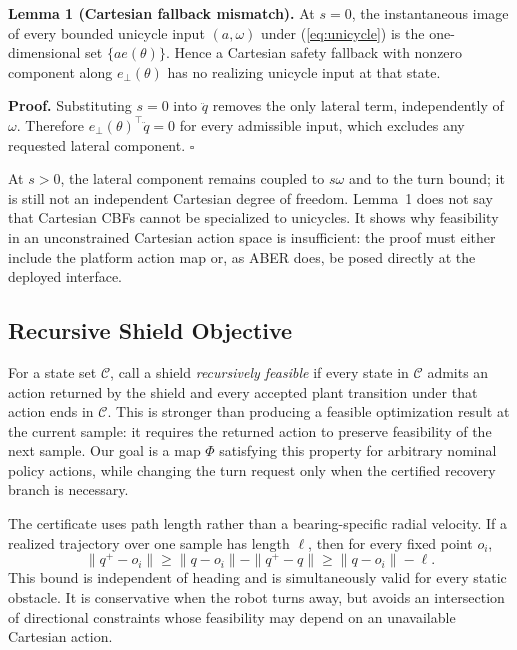 \documentclass[letterpaper]{article}
\begin{document}
\textbf{Lemma 1 (Cartesian fallback mismatch).}
At $s=0$, the instantaneous image of every bounded unicycle input
$(a,\omega)$ under (\ref{eq:unicycle}) is the one-dimensional set
$\{a e(\theta)\}$.  Hence a Cartesian safety fallback with nonzero component
along $e_\perp(\theta)$ has no realizing unicycle input at that state.

\textbf{Proof.}
Substituting $s=0$ into $\ddot q$ removes the only lateral term, independently
of $\omega$.  Therefore $e_\perp(\theta)^\top\ddot q=0$ for every admissible
input, which excludes any requested lateral component. $\square$

At $s>0$, the lateral component remains coupled to $s\omega$ and to the turn
bound; it is still not an independent Cartesian degree of freedom.  Lemma~1
does not say that Cartesian CBFs cannot be specialized to unicycles.  It shows
why feasibility in an unconstrained Cartesian action space is insufficient:
the proof must either include the platform action map or, as ABER does, be
posed directly at the deployed interface.

\subsection{Recursive Shield Objective}

For a state set $\mathcal C$, call a shield \emph{recursively feasible} if
every state in $\mathcal C$ admits an action returned by the shield and every
accepted plant transition under that action ends in $\mathcal C$.  This is
stronger than producing a feasible optimization result at the current sample:
it requires the returned action to preserve feasibility of the next sample.
Our goal is a map $\Phi$ satisfying this property for arbitrary nominal policy
actions, while changing the turn request only when the certified recovery
branch is necessary.

The certificate uses path length rather than a bearing-specific radial
velocity.  If a realized trajectory over one sample has length $\ell$, then
for every fixed point $o_i$,
\begin{equation}
 \|q^+-o_i\|\ge \|q-o_i\|-\|q^+-q\|
               \ge \|q-o_i\|-\ell .                    \label{eq:pathlip}
\end{equation}
This bound is independent of heading and is simultaneously valid for every
static obstacle.  It is conservative when the robot turns away, but avoids an
intersection of directional constraints whose feasibility may depend on an
unavailable Cartesian action.
\end{document}
